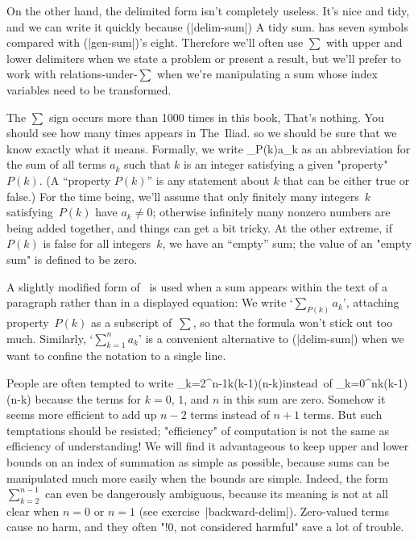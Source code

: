 On the other hand, the delimited form isn't completely useless.
It's nice and tidy, and we can write it quickly because \eq(|delim-sum|)
\g A tidy sum.\g
has seven symbols compared with \eq(|gen-sum|)'s eight.
Therefore we'll often use $\sum$ with upper and lower delimiters
when we state a problem or present a result, but we'll
prefer to work with relations-under-$\sum$ when we're manipulating a sum
whose index variables need to be transformed.

The $\sum$ sign occurs more than 1000 times in this book,
\g That's nothing. You should see how many times {} appears
in The~Iliad.\g
 so we should be
sure that we know exactly what it means. Formally, we write
\begindisplay
\sum_{P(k)}a_k\eqno
\enddisplay
as an abbreviation for the sum of all terms $a_k$ such that $k$ is an
integer satisfying a given "property" $P(k)$. (A ``property $P(k)$'' is
any statement about $k$ that can be either true or false.)
 For the time being, we'll
assume that only finitely many integers~$k$ satisfying~$P(k)$ have
$a_k\ne0$; otherwise infinitely many nonzero numbers are being added
together, and things can get a bit tricky. At the other extreme, if
$P(k)$ is false for all integers~$k$, we have an ``empty'' sum;
the value of an "empty sum" is defined to be zero.

A slightly modified form
of \thiseq\ is used when a sum appears within the text of a paragraph
rather than in a displayed equation: We write `$\sum_{P(k)}a_k$', attaching
property~$P(k)$ as a subscript of~$\sum$, so that the formula won't
stick out too much. Similarly, `$\sum_{k=1}^na_k$' is a convenient
alternative to \eq(|delim-sum|) when we want to confine the notation
to a single line.

People are often tempted to write
\begindisplay\advance\abovedisplayskip-3pt\advance\belowdisplayskip-3pt
\sum_{k=2}^{n-1}k(k-1)(n-k)\qquad\hbox{instead of}
 \qquad\sum_{k=0}^{n}k(k-1)(n-k)
\enddisplay
because the terms for $k=0$, $1$, and $n$ in this sum are zero. Somehow it
seems more efficient to add up $n-2$ terms instead of $n+1$ terms.
But such temptations should be resisted; "efficiency" of computation is
not the same as efficiency of understanding!  We will find it advantageous
to keep upper and lower bounds
on an index of summation as simple as possible, because
sums can be manipulated much more easily when the bounds
are simple. Indeed, the form $\sum_{k=2}^{n-1}$ can even be dangerously
ambiguous, because its meaning is not at all clear when $n=0$ or $n=1$
(see exercise~|backward-delim|). Zero-valued terms cause no harm, and they often
"!0, not considered harmful"
save a lot of trouble.


